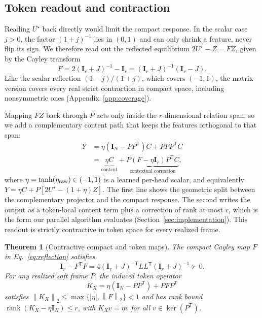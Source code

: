 \documentclass[10pt,twocolumn]{article}
\newtheorem{theorem}{Theorem}[section]
\newcommand{\I}{\mathbf{I}}
\newcommand{\T}{\mathsf{T}}
\newcommand{\norm}[1]{\left\lVert #1 \right\rVert}
\newcommand{\rank}{\operatorname{rank}}
\begin{document}
\subsection{Token readout and contraction}
\label{sec:readout}
\label{sec:stability}

Reading $U^\star$ back directly would limit the compact response.
In the scalar case $j>0$, the factor $(1+j)^{-1}$ lies in $(0,1)$ and can only
shrink a feature, never flip its sign.
We therefore read out the reflected equilibrium $2U^\star-Z=FZ$, given by the
Cayley transform
\begin{equation}
 F=2(\I_r+J)^{-1}-\I_r=(\I_r+J)^{-1}(\I_r-J).
 \label{eq:reflection}
\end{equation}
Like the scalar reflection $(1-j)/(1+j)$, which covers $(-1,1)$, the matrix
version covers every real strict contraction in compact space, including
nonsymmetric ones \cite{wang2023direct} (Appendix~\ref{app:coverage}).

Mapping $FZ$ back through $P$ acts only inside the $r$-dimensional relation
span, so we add a complementary content path that keeps the features
orthogonal to that span:
\begin{align}
 Y&=\eta(\I_N-PP^\T)C+PFP^\T C\\
 &=\underbrace{\eta C}_{\text{content}}
   +\underbrace{P(F-\eta\I_r)P^\T C}_{\text{contextual correction}},
 \label{eq:readout}
\end{align}
where $\eta=\tanh(\eta_{\rm raw})\in(-1,1)$ is a learned per-head scalar, and
equivalently $Y=\eta C+P[2U^\star-(1+\eta)Z]$.
The first line shows the geometric split between the complementary projector
and the compact response.
The second writes the output as a token-local content term plus a correction
of rank at most $r$, which is the form our parallel algorithm evaluates
(Section~\ref{sec:implementation}).
This readout is strictly contractive in token space for every realized frame.

\begin{theorem}[Contractive compact and token maps]
\label{thm:contraction}
The compact Cayley map $F$ in Eq.~\eqref{eq:reflection} satisfies
\begin{equation}
 \I_r-F^\T F=4(\I_r+J)^{-\T}LL^\T(\I_r+J)^{-1}\succ0.
\end{equation}
For any realized soft frame $P$, the induced token operator
\begin{equation}
 K_X=\eta(\I_N-PP^\T)+PFP^\T
 \label{eq:tokenmap}
\end{equation}
satisfies $\norm{K_X}_2\le\max\{|\eta|,\norm{F}_2\}<1$ and has rank bound
$\rank(K_X-\eta\I_N)\le r$, with $K_Xv=\eta v$ for all $v\in\ker(P^\T)$.
\end{theorem}
\end{document}
